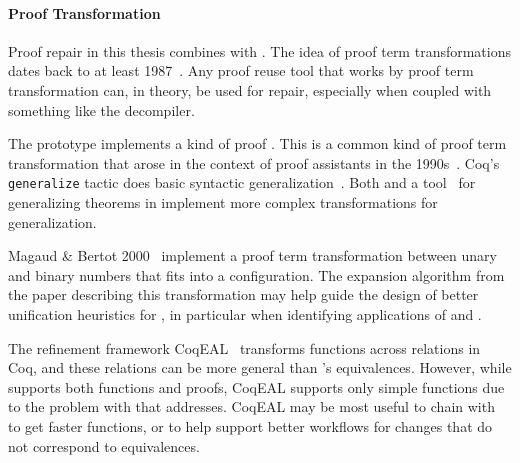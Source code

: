 \paragraph{Proof Transformation}
Proof repair in this thesis combines  with .
The idea of proof term transformations dates back to at least 1987~\cite{pfenning}.
Any proof reuse tool that works by proof term transformation can, in theory, be used for repair, especially when coupled with something like the \toolnamec decompiler.

The \sysname prototype implements a kind of proof .
This is a common kind of proof term transformation that arose in the context of proof assistants
in the 1990s~\cite{hasker1992generalization, kolbe1998proof, pons1999conception}.
Coq's \lstinline{generalize} tactic does basic syntactic generalization~\cite{coq-tactics}.
Both \sysname and a tool~\cite{Johnsen2004} for generalizing theorems in 
implement more complex transformations for generalization.

Magaud \& Bertot 2000~\cite{magaud2000changing} implement a proof term transformation between
unary and binary numbers that fits into a \toolnamec configuration.
The expansion algorithm from the paper describing this transformation may help guide the design
of better unification heuristics for \toolnamec, in particular when identifying applications of  
and .

The refinement framework CoqEAL~\cite{cohen:hal-01113453} transforms functions across relations in Coq,
and these relations can be more general than \toolnamec's equivalences.
However, while \toolnamec supports both functions and proofs, CoqEAL supports only simple functions
due to the problem with  that  addresses.
CoqEAL may be most useful to chain with \toolnamec to get faster functions,
or to help support better workflows for changes that do not correspond to equivalences.


